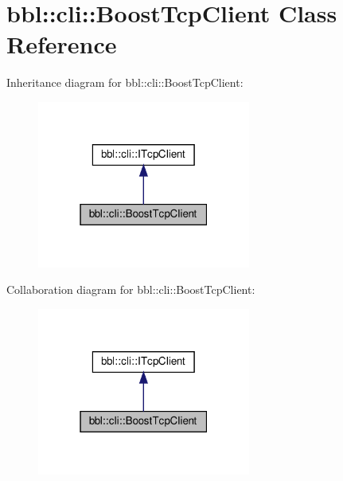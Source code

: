 \hypertarget{classbbl_1_1cli_1_1_boost_tcp_client}{}\section{bbl\+:\+:cli\+:\+:Boost\+Tcp\+Client Class Reference}
\label{classbbl_1_1cli_1_1_boost_tcp_client}


Inheritance diagram for bbl\+:\+:cli\+:\+:Boost\+Tcp\+Client\+:
\nopagebreak
\begin{figure}[H]
\begin{center}
\leavevmode
\includegraphics[width=199pt]{classbbl_1_1cli_1_1_boost_tcp_client__inherit__graph}
\end{center}
\end{figure}


Collaboration diagram for bbl\+:\+:cli\+:\+:Boost\+Tcp\+Client\+:
\nopagebreak
\begin{figure}[H]
\begin{center}
\leavevmode
\includegraphics[width=199pt]{classbbl_1_1cli_1_1_boost_tcp_client__coll__graph}
\end{center}
\end{figure}
